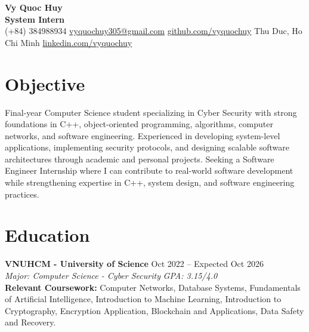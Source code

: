 \documentclass[10pt,a4paper]{article}
\begin{document}
\pagestyle{empty}

\begin{center}
    {\huge \textbf{Vy Quoc Huy}} \\ \vspace{4pt}
    {\Large \textbf{System Intern}} \\ \vspace{4pt}
    (+84) 384988934 \quad \href{mailto:vyquochuy305@gmail.com}{vyquochuy305@gmail.com} \quad \href{https://github.com/vyquochuy}{github.com/vyquochuy} \quad Thu Duc, Ho Chi Minh \quad \href{https://www.linkedin.com/in/vyquochuy/}{linkedin.com/vyquochuy}
\end{center}

\section*{Objective}
Final-year Computer Science student specializing in Cyber Security with strong foundations in C++, object-oriented programming, algorithms, computer networks, and software engineering. Experienced in developing system-level applications, implementing security protocols, and designing scalable software architectures through academic and personal projects. Seeking a Software Engineer Internship where I can contribute to real-world software development while strengthening expertise in C++, system design, and software engineering practices.

\section*{Education}
\noindent \textbf{VNUHCM - University of Science} \hfill Oct 2022 -- Expected Oct 2026\\
\textit{Major: Computer Science - Cyber Security} \hfill \textit{GPA: 3.15/4.0}\\
\textbf{Relevant Coursework:} Computer Networks, Database Systems, Fundamentals of Artificial Intelligence, Introduction to Machine Learning, Introduction to Cryptography, Encryption Application, Blockchain and Applications, Data Safety and Recovery.


\end{document}
